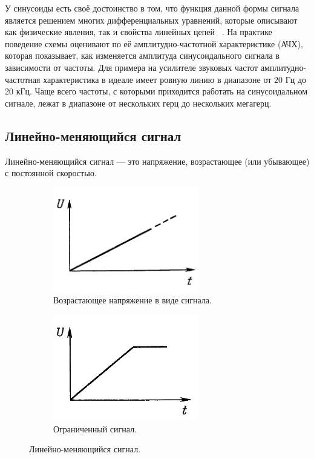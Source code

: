 	У синусоиды есть своё достоинство в том, что функция данной формы сигнала является решением многих дифференциальных уравнений, которые описывают как физические явления, так и свойства линейных цепей ~\cite{is1}. На практике поведение схемы оценивают по её амплитудно-частотной характеристике (АЧХ), которая показывает, как изменяется амплитуда синусоидального сигнала в зависимости от частоты. Для примера на усилителе звуковых частот амплитудно-частотная характеристика в идеале имеет ровную линию в диапазоне от 20 Гц до 20 кГц. Чаще всего частоты, с которыми приходится работать на синусоидальном сигнале, лежат в диапазоне от нескольких герц до нескольких мегагерц.

\subsection{Линейно-меняющийся сигнал}
	Линейно-меняющийся сигнал --- это напряжение, возрастающее (или убывающее) с постоянной скоростью.

\begin{figure}[H]
     \begin{subfigure}[H]{0.45\textwidth}
         \centering
         \includegraphics[width=0.70\textwidth]{../image/s_la.png}
         \caption{Возрастающее напряжение в виде сигнала.}
     \end{subfigure}
     \hfill
     \begin{subfigure}[H]{0.45\textwidth}
         \centering
         \includegraphics[width=0.70\textwidth]{../image/s_lb.png}
         \caption{Ограниченный сигнал.}
     \end{subfigure}
        \caption{Линейно-меняющийся сигнал.}
\end{figure}

